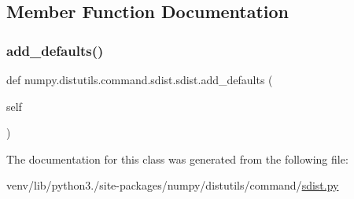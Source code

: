\subsection{Member Function Documentation}
\mbox{\label{classnumpy_1_1distutils_1_1command_1_1sdist_1_1sdist_a1b3f0f49b828144827999723be947986}} 
\subsubsection{\texorpdfstring{add\+\_\+defaults()}{add\_defaults()}}
{\footnotesize\ttfamily def numpy.\+distutils.\+command.\+sdist.\+sdist.\+add\+\_\+defaults (\begin{DoxyParamCaption}\item[{}]{self }\end{DoxyParamCaption})}



The documentation for this class was generated from the following file\+:\begin{DoxyCompactItemize}
\item 
venv/lib/python3./site-\/packages/numpy/distutils/command/\hyperlink{numpy_2distutils_2command_2sdist_8py}{sdist.\+py}\end{DoxyCompactItemize}
